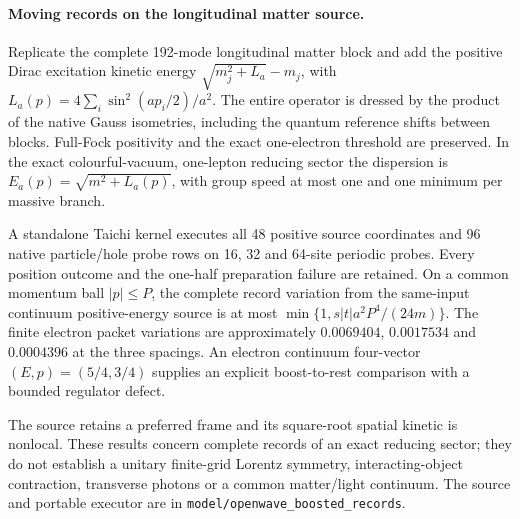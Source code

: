 \paragraph{Moving records on the longitudinal matter source.}
Replicate the complete 192-mode longitudinal matter block and add the
positive Dirac excitation kinetic energy
$\sqrt{m_j^2+L_a}-m_j$, with
$L_a(p)=4\sum_i\sin^2(ap_i/2)/a^2$.
The entire operator is dressed by the product of the native Gauss
isometries, including the quantum reference shifts between blocks.
Full-Fock positivity and the exact one-electron threshold are preserved.
In the exact colourful-vacuum, one-lepton reducing sector the dispersion
is $E_a(p)=\sqrt{m^2+L_a(p)}$, with group speed at most one and one
minimum per massive branch.

A standalone Taichi kernel executes all 48 positive source coordinates
and 96 native particle/hole probe rows on 16, 32 and 64-site periodic
probes. Every position outcome and the one-half preparation failure are
retained. On a common momentum ball $|p|\leq P$, the complete record
variation from the same-input continuum positive-energy source is at most
$\min\{1,s|t|a^2P^4/(24m)\}$. The finite electron packet variations are
approximately $0.0069404$, $0.0017534$ and $0.0004396$ at the three
spacings. An electron continuum four-vector $(E,p)=(5/4,3/4)$ supplies
an explicit boost-to-rest comparison with a bounded regulator defect.

The source retains a preferred frame and its square-root spatial kinetic
is nonlocal. These results concern complete records of an exact reducing
sector; they do not establish a unitary finite-grid Lorentz symmetry,
interacting-object contraction, transverse photons or a common matter/light
continuum. The source and portable executor are in
\texttt{model/openwave\_boosted\_records}.

